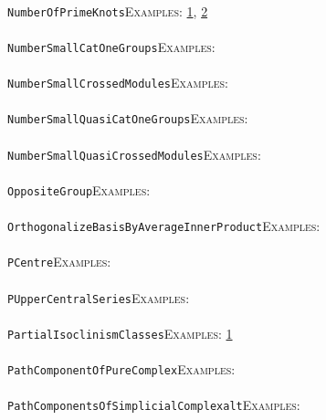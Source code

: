 \documentclass[a4paper,11pt]{report}
\begin{document}
{{ \\
 \texttt{NumberOfPrimeKnots}{\nobreakspace}{\nobreakspace}{\nobreakspace}{\nobreakspace}\textsc{Examples:} \href{../www/SideLinks/About/aboutQuandles2.html} {1}{\nobreakspace}, \href{../www/SideLinks/About/aboutQuandles.html} {2}{\nobreakspace} \\
 \\
 \texttt{NumberSmallCatOneGroups}{\nobreakspace}{\nobreakspace}{\nobreakspace}{\nobreakspace}\textsc{Examples:} \\
 \\
 \texttt{NumberSmallCrossedModules}{\nobreakspace}{\nobreakspace}{\nobreakspace}{\nobreakspace}\textsc{Examples:} \\
 \\
 \texttt{NumberSmallQuasiCatOneGroups}{\nobreakspace}{\nobreakspace}{\nobreakspace}{\nobreakspace}\textsc{Examples:} \\
 \\
 \texttt{NumberSmallQuasiCrossedModules}{\nobreakspace}{\nobreakspace}{\nobreakspace}{\nobreakspace}\textsc{Examples:} \\
 \\
 \texttt{OppositeGroup}{\nobreakspace}{\nobreakspace}{\nobreakspace}{\nobreakspace}\textsc{Examples:} \\
 \\
 \texttt{OrthogonalizeBasisByAverageInnerProduct}{\nobreakspace}{\nobreakspace}{\nobreakspace}{\nobreakspace}\textsc{Examples:} \\
 \\
 \texttt{PCentre}{\nobreakspace}{\nobreakspace}{\nobreakspace}{\nobreakspace}\textsc{Examples:} \\
 \\
 \texttt{PUpperCentralSeries}{\nobreakspace}{\nobreakspace}{\nobreakspace}{\nobreakspace}\textsc{Examples:} \\
 \\
 \texttt{PartialIsoclinismClasses}{\nobreakspace}{\nobreakspace}{\nobreakspace}{\nobreakspace}\textsc{Examples:} \href{../www/SideLinks/About/aboutBogomolov.html} {1}{\nobreakspace} \\
 \\
 \texttt{PathComponentOfPureComplex}{\nobreakspace}{\nobreakspace}{\nobreakspace}{\nobreakspace}\textsc{Examples:} \\
 \\
 \texttt{PathComponentsOfSimplicialComplex{\textunderscore}alt}{\nobreakspace}{\nobreakspace}{\nobreakspace}{\nobreakspace}\textsc{Examples:} \\
}}
\end{document}

